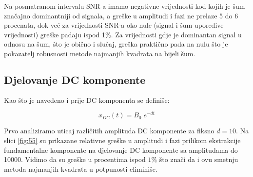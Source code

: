 Na posmatranom intervalu SNR-a imamo negativne vrijednosti kod kojih je šum značajno dominantniji od signala, a greške u amplitudi i fazi ne prelaze 5 do 6 procenata, dok već za vrijednosti SNR-a oko nule (signal i šum uporedive vrijednosti) greške padaju ispod 1$\%$. Za vrijednosti gdje je dominantan signal u odnosu na šum, što je obično i slučaj, greška praktično pada na nulu što je pokazatelj robusnosti metode najmanjih kvadrata na bijeli šum.

\subsection{Djelovanje DC komponente}
Kao što je navedeno i prije DC komponenta se definiše:

\begin{equation}
    x_{DC}(t) = B_0\;e^{-dt}
\end{equation}

Prvo analiziramo uticaj različitih amplituda DC komponente za fiksno $d = 10$. Na slici \ref{fig:55} su prikazane relativne greške u amplitudi i fazi prilikom ekstrakcije fundamentalne komponente na djelovanje DC komponente sa amplitudama do 10000. Vidimo da su greške u procentima ispod $1\%$ što znači da i ovu smetnju metoda najmanjih kvadrata u potpunosti eliminiše.

